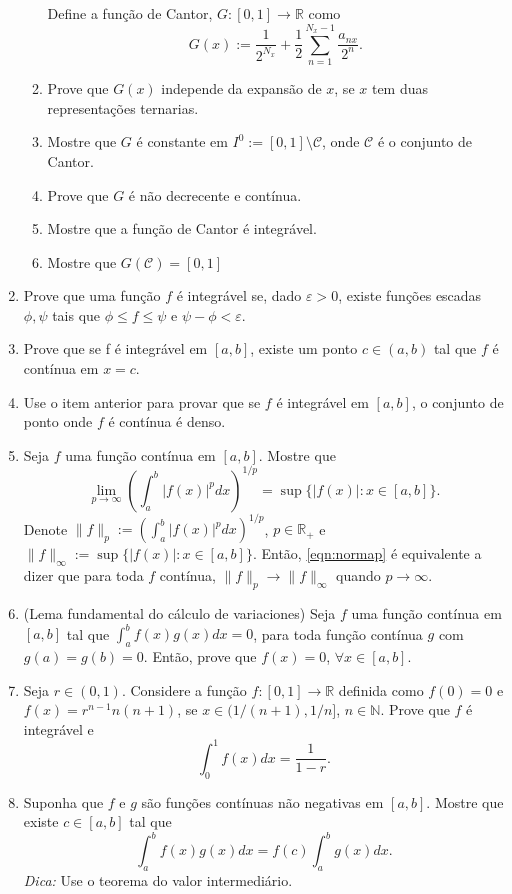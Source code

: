 \documentclass{article}
\theoremstyle{plain}
\theoremstyle{definition}
\theoremstyle{remark}
\newcommand{\R}{{\mathbb R}}
\begin{document}
\begin{enumerate}
\begin{enumerate}
   Define a função de Cantor, $G:[0,1]\rightarrow \R$ como 
   $$ G(x):= \frac{1}{2^{N_x}}+ \frac{1}{2} \sum_{n=1}^{N_x-1}\frac{a_{nx}}{2^{n}}.$$
   \item Prove que $G(x)$ independe da expansão de $x$, se 
   $x$ tem duas representações ternarias. 
   \item Mostre que $G$ é constante em $I^{0}:=[0,1] \setminus \mathcal{C}$, 
   onde $\mathcal{C}$ é o conjunto de Cantor.
   \item Prove que $G$ é não decrecente e contínua.
   \item Mostre que a função de Cantor é integrável.
   \item Mostre que $G(\mathcal{C})=[0,1]$ 
\end{enumerate}    

  \item Prove que uma função $f$ é integrável se, dado $\varepsilon>0$, existe funções escadas $\phi, \psi$ tais que $\phi \leq f \leq \psi$ e $\psi-\phi < \varepsilon$.   
  \item Prove que se f é integrável em $[a,b]$, existe um ponto $c \in(a,b)$
  tal que $f$ é contínua em $x=c$.
  \item Use o item anterior para provar  que se $f$ é integrável em $[a,b]$, 
  o conjunto de ponto onde $f$ é contínua é denso.
  \item Seja $f$ uma função contínua em $[a,b]$.
  Mostre que 
    \begin{equation}\label{eqn:normap}
    \lim_{p \rightarrow \infty} \left(\int_{a}^{b} |f(x)|^{p}dx\right)^{1/p}=
  \sup\{|f(x)|:x \in [a,b]\}.
    \end{equation}
 Denote
  $\|f\|_p:=\left(\int_{a}^{b} |f(x)|^{p}dx\right)^{1/p}$, $p \in \mathbb{R}_{+}$ e  $\|f\|_{\infty}:=\sup\{|f(x)|:x \in [a,b]\}$. Então,  
  \eqref{eqn:normap} é equivalente a dizer que  para toda $f$ contínua, 
  $\|f\|_{p} \rightarrow \|f\|_{\infty}$ quando $p \rightarrow \infty$.
  \item (Lema fundamental do cálculo de variaciones) Seja $f$ uma função contínua em $[a,b]$ tal que
  $\int_{a}^{b} f(x)g(x)dx=0$, para toda função contínua $g$ com $g(a)=g(b)=0$. Então, prove que $f(x)=0$, $\forall x \in [a,b]$.
  \item Seja $r \in (0,1)$. Considere a função 
  $f:[0,1]\rightarrow \R$
  definida como $f(0)=0$ e $f(x)=r^{n-1}n(n+1)$, 
  se $x \in (1/(n+1), 1/n]$, $n \in \mathbb{N}$. Prove que $f$ é integrável 
  e $$\int_{0}^{1} f(x)dx= \frac{1}{1-r}.$$
   \item Suponha que 
  $f$ e $g$ são funções contínuas não negativas em $[a,b]$. Mostre que existe $c \in [a,b]$ tal que 
   $$\int_{a}^{b} f(x)g(x)dx= f(c) \int_{a}^{b} g(x)dx. $$
   {\it Dica:} Use o teorema do valor intermediário.
\end{enumerate}
\end{document}
